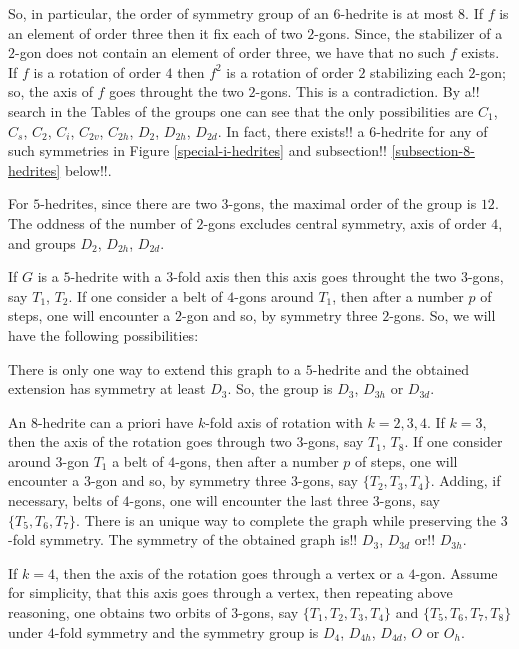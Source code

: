 \documentclass[12pt]{article}
\begin{document}
So, in particular, the order of symmetry group of an $6$-hedrite is at most $8$. If $f$ is an element of order three then it fix each of two $2$-gons. Since, the stabilizer of a $2$-gon does not contain an element of order three, we have that no such $f$ exists. If $f$ is a rotation of order $4$ then $f^2$ is a rotation of order $2$ stabilizing each $2$-gon; so, the axis of $f$ goes throught the two $2$-gons. This is a contradiction. 
By a!! search in the Tables of the groups one can see that the only possibilities are $C_1$, $C_s$, $C_2$, $C_i$, $C_{2v}$, $C_{2h}$, $D_2$, $D_{2h}$, $D_{2d}$. In fact, there exists!! a $6$-hedrite for any of such symmetries in Figure \ref{special-i-hedrites} and subsection!! 
\ref{subsection-8-hedrites} below!!.


For $5$-hedrites, since there are two $3$-gons, the maximal order of the group is $12$. The oddness of the number of $2$-gons excludes central symmetry, axis of order $4$, and groups $D_2$, $D_{2h}$, $D_{2d}$.

If $G$ is a $5$-hedrite with a $3$-fold axis then this axis goes throught the two $3$-gons, say $T_1$, $T_2$. If one consider a belt of $4$-gons around $T_1$, then after a number $p$ of steps, one will encounter a $2$-gon and so, by symmetry three $2$-gons. So, we will have the following possibilities:

\begin{center}
\epsfxsize=60mm
\end{center}

There is only one way to extend this graph to a $5$-hedrite and the obtained extension has symmetry at least $D_3$. So, the group is $D_{3}$, 
$D_{3h}$ or $D_{3d}$.

An $8$-hedrite can a priori have $k$-fold axis of rotation with $k=2, 3, 4$. If $k=3$, then the axis of the rotation goes through two $3$-gons, say $T_1$, $T_8$. If one consider around $3$-gon $T_1$ a belt of $4$-gons, then after a number $p$ of steps, one will encounter a $3$-gon and so, by symmetry three $3$-gons, say $\{T_2, T_3, T_4\}$. Adding, if necessary, belts of $4$-gons, one will encounter the last three $3$-gons, say $\{T_5, T_6, T_7\}$. There is an unique way to complete the graph while preserving the $3$-fold symmetry. The symmetry of the obtained graph is!! $D_3$, $D_{3d}$ or!! $D_{3h}$. 

If $k=4$, then the axis of the rotation goes through a vertex or a $4$-gon. Assume for simplicity, that this axis goes through a vertex, then repeating above reasoning, one obtains two orbits of $3$-gons, say $\{T_1, T_2, T_3, T_4\}$ and $\{T_5, T_6, T_7, T_8\}$ under $4$-fold symmetry and the symmetry group is $D_4$, $D_{4h}$, $D_{4d}$, $O$ or $O_h$.
\end{document}
